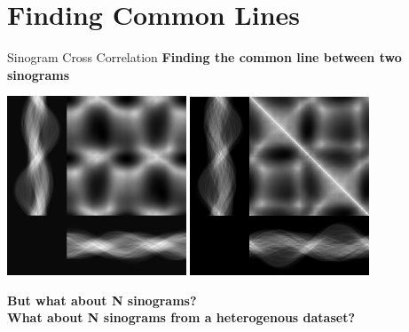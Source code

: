 \documentclass[t, 11pt, xcolor=dvipsnames]{beamer}
\begin{document}
\section{Finding Common Lines}

\begin{frame}[fragile]{Sinogram Cross Correlation}
  \centering\textbf{Finding the common line between two sinograms}
    {\begin{center}
      \includegraphics[width=0.4\textwidth]{images/2sin_comp.png}
      \includegraphics[width=0.4\textwidth]{images/self_correl.png}
    \end{center}}
  \pause
  \pause
  \centering\textbf{But what about N sinograms?} \\
  \pause
  \centering\textbf{What about N sinograms from a heterogenous dataset?}

\end{frame}
\end{document}
